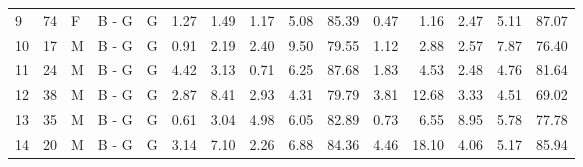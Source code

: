 \begin{landscape}
\begin{table}[htbp]
\begin{tabular}{lllllrrrrrrrrrr}
9                                        & 74                                      & F                                       & B - G                                    & G                                       & 1.27                   & 1.49                   & 1.17                    & 5.08                    & 85.39                  & 0.47                   & 1.16                   & 2.47                    & 5.11                    & 87.07                  \\
10                                       & 17                                      & M                                       & B - G                                    & G                                       & 0.91                   & 2.19                   & 2.40                    & 9.50                    & 79.55                  & 1.12                   & 2.88                   & 2.57                    & 7.87                    & 76.40                  \\
11                                       & 24                                      & M                                       & B - G                                    & G                                       & 4.42                   & 3.13                   & 0.71                    & 6.25                    & 87.68                  & 1.83                   & 4.53                   & 2.48                    & 4.76                    & 81.64                  \\
12                                       & 38                                      & M                                       & B - G                                    & G                                       & 2.87                   & 8.41                   & 2.93                    & 4.31                    & 79.79                  & 3.81                   & 12.68                  & 3.33                    & 4.51                    & 69.02                  \\
13                                       & 35                                      & M                                       & B - G                                    & G                                       & 0.61                   & 3.04                   & 4.98                    & 6.05                    & 82.89                  & 0.73                   & 6.55                   & 8.95                    & 5.78                    & 77.78                  \\
14                                       & 20                                      & M                                       & B - G                                    & G                                       & 3.14                   & 7.10                   & 2.26                    & 6.88                    & 84.36                  & 4.46                   & 18.10                  & 4.06                    & 5.17                    & 85.94                  \\

\end{tabular}
\end{table}
\end{landscape}

